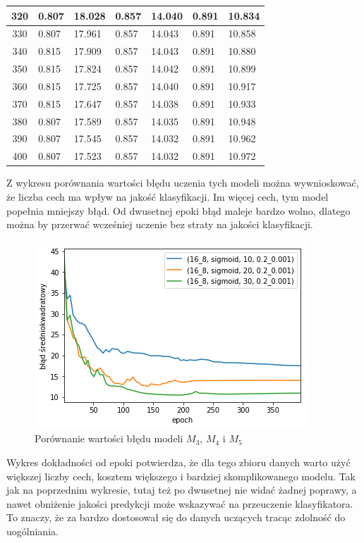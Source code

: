 \begin{longtable}{|c|l|l|l|l|l|l|}
        320 & 0.807 & 18.028 & 0.857 & 14.040 & 0.891 & 10.834 \\ \hline
        330 & 0.807 & 17.961 & 0.857 & 14.043 & 0.891 & 10.858 \\ \hline
        340 & 0.815 & 17.909 & 0.857 & 14.043 & 0.891 & 10.880 \\ \hline
        350 & 0.815 & 17.824 & 0.857 & 14.042 & 0.891 & 10.899 \\ \hline
        360 & 0.815 & 17.725 & 0.857 & 14.040 & 0.891 & 10.917 \\ \hline
        370 & 0.815 & 17.647 & 0.857 & 14.038 & 0.891 & 10.933 \\ \hline
        380 & 0.807 & 17.589 & 0.857 & 14.035 & 0.891 & 10.948 \\ \hline
        390 & 0.807 & 17.545 & 0.857 & 14.032 & 0.891 & 10.962 \\ \hline
        400 & 0.807 & 17.523 & 0.857 & 14.032 & 0.891 & 10.972 \\ \hline
    \end{longtable}

    Z wykresu porównania wartości błędu uczenia tych modeli można wywnioskować, że liczba cech ma wpływ na jakość klasyfikacji.
    Im więcej cech, tym model popełnia mniejszy błąd.
    Od dwusetnej epoki błąd maleje bardzo wolno, dlatego można by przerwać wcześniej uczenie bez straty na jakości klasyfikacji.

    \begin{figure}[htp]
        \centering
        \includegraphics[scale=0.8]{./img/feat-error.png}
        \caption{Porównanie wartości błędu modeli $M_3$, $M_4$ i $M_5$}
    \end{figure}

    Wykres dokładności od epoki potwierdza, że dla tego zbioru danych warto użyć większej liczby cech, kosztem większego i bardziej skomplikowanego modelu.
    Tak jak na poprzednim wykresie, tutaj też po dwusetnej nie widać żadnej poprawy, a nawet obniżenie jakości predykcji może wskazywać na przeuczenie klasyfikatora.
    To znaczy, że za bardzo dostosował się do danych uczących tracąc zdolność do uogólniania.

